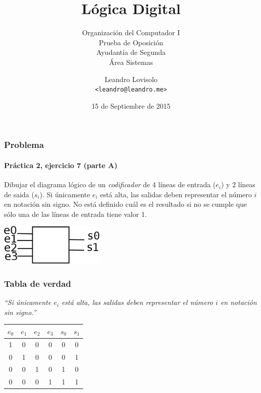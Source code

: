 \documentclass[spanish]{beamer}
\title{Lógica Digital}
\subtitle{
  Organización del Computador I \\
  \vspace{2em}
  Prueba de Oposición \\
  Ayudantía de Segunda \\
  Área Sistemas
}
\author{Leandro Lovisolo \\ \footnotesize{\texttt{<leandro@leandro.me>}}}
\date{15 de Septiembre de 2015}
\institute{
  Departamento de Computación \\
  Facultad de Ciencias Exactas y Naturales \\
  Universidad de Buenos Aires
}
\begin{document}
\begin{frame}
  \titlepage
\end{frame}

\begin{frame}
  \frametitle{Problema}
  \framesubtitle{Práctica 2, ejercicio 7 (parte A)}

  Dibujar el diagrama lógico de un \textit{codificador} de 4 líneas de
  entrada ($e_i$) y 2 líneas de saida ($s_i$). Si únicamente $e_i$ está alta,
  las salidas deben representar el número $i$ en notación sin signo. No está
  definido cuál es el resultado si no se cumple que sólo una de las líneas de
  entrada tiene valor 1.

  \begin{center}
    \vspace{1em}
    \includegraphics[width=5cm]{circuito.png}
  \end{center}
\end{frame}

\begin{frame}
  \frametitle{Tabla de verdad}

  \textit{``Si únicamente $e_i$ está alta, las salidas deben representar el
  número $i$ en notación sin signo.''}

  \pause

  \begin{center}
    \begin{tabular}{c|c|c|c||c|c}
      $e_0$ & $e_1$ & $e_2$ & $e_3$ & $s_0$ & $s_1$ \\
      \hline
      1 & 0 & 0 & 0 & 0 & 0 \\
      0 & 1 & 0 & 0 & 0 & 1 \\
      0 & 0 & 1 & 0 & 1 & 0 \\
      0 & 0 & 0 & 1 & 1 & 1 \\
    \end{tabular}
  \end{center}
\end{frame}
\end{document}
